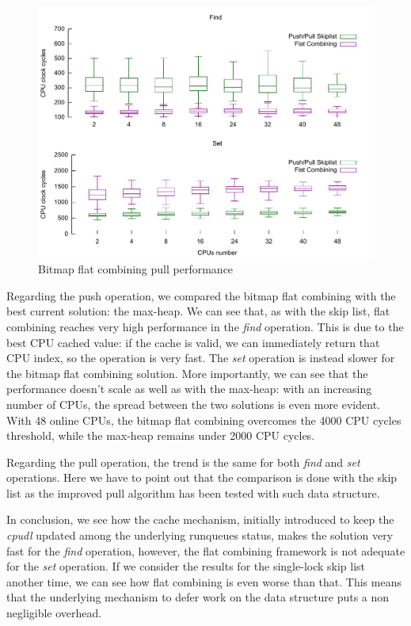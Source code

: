 \begin{figure}[htbp]
    \includegraphics[width=\columnwidth]{images/bm_fc_pull}
    \caption{Bitmap flat combining pull performance}
    \label{fig:bm_fc_pull}
\end{figure}

Regarding the push operation, we compared the bitmap flat combining
with the best current solution: the max-heap. We can see that,
as with the skip list, flat combining reaches very high performance in
the \emph{find} operation. This is due to the best CPU cached value:
if the cache is valid, we can immediately return that CPU index, so
the operation is very fast. The \emph{set} operation is instead slower
for the bitmap flat combining solution. More importantly, we can see
that the performance doesn't scale as well as with the max-heap:
with an increasing number of CPUs, the spread between the two solutions
is even more evident. With 48 online CPUs, the bitmap flat combining
overcomes the 4000 CPU cycles threshold, while the max-heap remains
under 2000 CPU cycles.

Regarding the pull operation, the trend is the same for both \emph{find}
and \emph{set} operations. Here we have to point out that the comparison
is done with the skip list as the improved pull algorithm has been tested
with such data structure.

In conclusion, we see how the cache mechanism, initially introduced
to keep the \emph{cpudl} updated among the underlying runqueues status,
makes the solution very fast for the \emph{find} operation, however, the
flat combining framework is not adequate for the \emph{set} operation.
If we consider the results for the single-lock skip list another time,
we can see how flat combining is even worse than that. This means that
the underlying mechanism to defer work on the data structure puts a non
negligible overhead.

